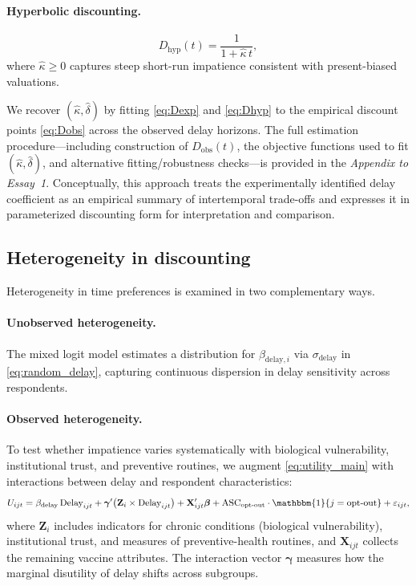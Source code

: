 \documentclass[doublespacing]{utdthesis}
\begin{document}
\paragraph{Hyperbolic discounting.}
\begin{equation}
D_{\text{hyp}}(t)=\frac{1}{1+\hat{\kappa}\, t},
\label{eq:Dhyp}
\end{equation}
where $\hat{\kappa}\ge 0$ captures steep short-run impatience consistent with present-biased valuations.

We recover $(\hat{\kappa},\hat{\delta})$ by fitting \eqref{eq:Dexp} and \eqref{eq:Dhyp} to the empirical discount points \eqref{eq:Dobs} across the observed delay horizons. The full estimation procedure---including construction of $D_{\text{obs}}(t)$, the objective functions used to fit $(\hat{\kappa},\hat{\delta})$, and alternative fitting/robustness checks---is provided in the \textit{Appendix to Essay~1}. Conceptually, this approach treats the experimentally identified delay coefficient as an empirical summary of intertemporal trade-offs and expresses it in parameterized discounting form for interpretation and comparison.


\subsection*{Heterogeneity in discounting}

Heterogeneity in time preferences is examined in two complementary ways.

\paragraph{Unobserved heterogeneity.}
The mixed logit model estimates a distribution for $\beta_{\text{delay},i}$ via $\sigma_{\text{delay}}$ in \eqref{eq:random_delay}, capturing continuous dispersion in delay sensitivity across respondents.

\paragraph{Observed heterogeneity.}
To test whether impatience varies systematically with biological vulnerability, institutional trust, and preventive routines, we augment \eqref{eq:utility_main} with interactions between delay and respondent characteristics:
\begin{equation}
U_{ijt} =
\beta_{\text{delay}} \, \text{Delay}_{ijt}
+ \boldsymbol{\gamma}'\!\left(\mathbf{Z}_i \times \text{Delay}_{ijt}\right)
+ \mathbf{X}_{ijt}'\boldsymbol{\beta}
+ \text{ASC}_{\text{opt-out}} \cdot \mathbbm{1}\{j=\text{opt-out}\}
+ \varepsilon_{ijt},
\label{eq:heterogeneity}
\end{equation}
where $\mathbf{Z}_i$ includes indicators for chronic conditions (biological vulnerability), institutional trust, and measures of preventive-health routines, and $\mathbf{X}_{ijt}$ collects the remaining vaccine attributes. The interaction vector $\boldsymbol{\gamma}$ measures how the marginal disutility of delay shifts across subgroups.
\end{document}

